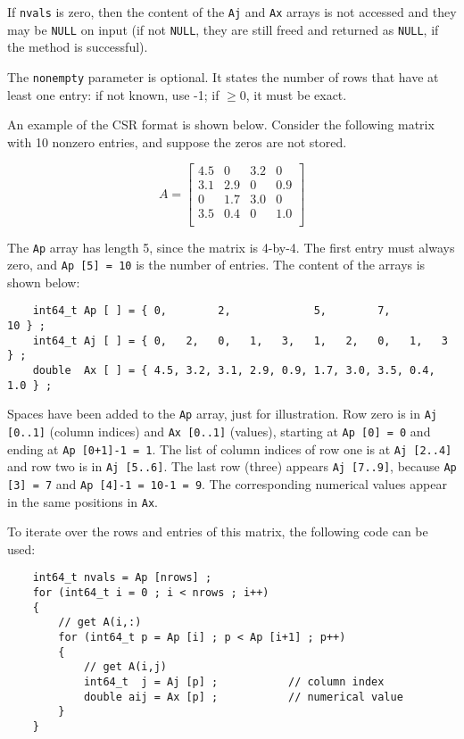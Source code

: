 \documentclass[12pt]{article}
\begin{document}
If \verb'nvals' is zero, then the content of the \verb'Aj' and \verb'Ax' arrays
is not accessed and they may be \verb'NULL' on input (if not \verb'NULL', they
are still freed and returned as \verb'NULL', if the method is successful).

The \verb'nonempty' parameter is optional.  It states the number of rows
that have at least one entry: if not known, use -1;
if $\ge 0$, it must be exact.

An example of the CSR format is shown below.  Consider the following
matrix with 10 nonzero entries, and suppose the zeros are not stored.

    \begin{equation}
    \label{eqn:Aexample}
    A = \left[
    \begin{array}{cccc}
    4.5 &   0 & 3.2 &   0 \\
    3.1 & 2.9 &  0  & 0.9 \\
     0  & 1.7 & 3.0 &   0 \\
    3.5 & 0.4 &  0  & 1.0 \\
    \end{array}
    \right]
    \end{equation}

The \verb'Ap' array has length 5, since the matrix is 4-by-4.  The first entry
must always zero, and \verb'Ap [5] = 10' is the number of entries.
The content of the arrays is shown below:

{\footnotesize
\begin{verbatim}
    int64_t Ap [ ] = { 0,        2,             5,        7,            10 } ;
    int64_t Aj [ ] = { 0,   2,   0,   1,   3,   1,   2,   0,   1,   3   } ;
    double  Ax [ ] = { 4.5, 3.2, 3.1, 2.9, 0.9, 1.7, 3.0, 3.5, 0.4, 1.0 } ; \end{verbatim} }

Spaces have been added to the \verb'Ap' array, just for illustration.  Row zero
is in \verb'Aj [0..1]' (column indices) and \verb'Ax [0..1]' (values), starting
at \verb'Ap [0] = 0' and ending at \verb'Ap [0+1]-1 = 1'.  The list of column
indices of row one is at \verb'Aj [2..4]' and row two is in \verb'Aj [5..6]'.
The last row (three) appears \verb'Aj [7..9]', because \verb'Ap [3] = 7' and
\verb'Ap [4]-1 = 10-1 = 9'.  The corresponding numerical values appear in the
same positions in \verb'Ax'.

To iterate over the rows and entries of this matrix, the following code can be
used:

    {\footnotesize
    \begin{verbatim}
    int64_t nvals = Ap [nrows] ;
    for (int64_t i = 0 ; i < nrows ; i++)
    {
        // get A(i,:)
        for (int64_t p = Ap [i] ; p < Ap [i+1] ; p++)
        {
            // get A(i,j)
            int64_t  j = Aj [p] ;           // column index
            double aij = Ax [p] ;           // numerical value
        }
    } \end{verbatim}}
\end{document}
